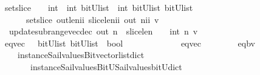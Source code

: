 \begin{isabellebody}
{}\isanewline
{}\isamarkupfalse%
\ set{\isacharunderscore}slice\ \ {\isacharcolon}{\isacharcolon}\ {\isachardoublequoteopen}\ int\ {\isasymRightarrow}\ int\ {\isasymRightarrow}{\isacharparenleft}bitU{\isacharparenright}list\ {\isasymRightarrow}\ int\ {\isasymRightarrow}{\isacharparenleft}bitU{\isacharparenright}list\ {\isasymRightarrow}{\isacharparenleft}bitU{\isacharparenright}list\ {\isachardoublequoteclose}\ \ \ \isanewline
\ \ \ \ \ {\isachardoublequoteopen}\ set{\isacharunderscore}slice\ {\isacharparenleft}out{\isacharunderscore}len{\isacharcolon}{\isacharcolon}ii{\isacharparenright}\ {\isacharparenleft}slice{\isacharunderscore}len{\isacharcolon}{\isacharcolon}ii{\isacharparenright}\ out\ {\isacharparenleft}n{\isacharcolon}{\isacharcolon}ii{\isacharparenright}\ v\ {\isacharequal}\ {\isacharparenleft}\isanewline
\ \ update{\isacharunderscore}subrange{\isacharunderscore}vec{\isacharunderscore}dec\ out\ {\isacharparenleft}{\isacharparenleft}n\ {\isacharplus}\ slice{\isacharunderscore}len{\isacharparenright}\ {\isacharminus}{\isacharparenleft}\ {}\ {\isacharcolon}{\isacharcolon}\ int{\isacharparenright}{\isacharparenright}\ n\ v\ {\isacharparenright}{\isachardoublequoteclose}\isanewline
\isanewline
\isanewline
%
\isanewline
%
\isanewline
{}\isamarkupfalse%
\ eq{\isacharunderscore}vec\ \ {\isacharcolon}{\isacharcolon}\ {\isachardoublequoteopen}{\isacharparenleft}bitU{\isacharparenright}list\ {\isasymRightarrow}{\isacharparenleft}bitU{\isacharparenright}list\ {\isasymRightarrow}\ bool\ {\isachardoublequoteclose}\ \ \ \ \ \ \isanewline
\ \ \ \ \ {\isachardoublequoteopen}\ eq{\isacharunderscore}vec\ \ \ \ {\isacharequal}\ {\isacharparenleft}\ \isanewline
\ \ eq{\isacharunderscore}bv\isanewline
\ \ \ \ {\isacharparenleft}instance{\isacharunderscore}Sail{}{\isacharunderscore}values{\isacharunderscore}Bitvector{\isacharunderscore}list{\isacharunderscore}dict\isanewline
\ \ \ \ \ \ \ instance{\isacharunderscore}Sail{}{\isacharunderscore}values{\isacharunderscore}BitU{\isacharunderscore}Sail{}{\isacharunderscore}values{\isacharunderscore}bitU{\isacharunderscore}dict{\isacharparenright}\ {\isacharparenright}{\isachardoublequoteclose}\isanewline

\end{isabellebody}
